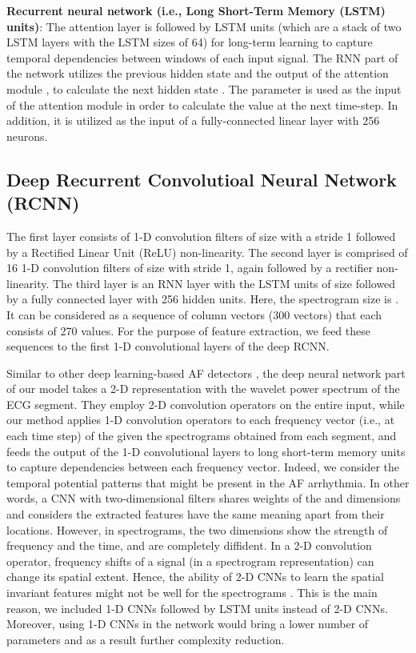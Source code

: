 \documentclass[conference]{IEEEtran}
\begin{document}
  
\noindent\textbf{Recurrent neural network (i.e., Long Short-Term Memory (LSTM) units)}:  The attention layer is followed by LSTM units (which are a stack of two LSTM layers with the LSTM sizes of 64) for long-term learning to capture temporal dependencies between windows of each input signal. The RNN part of the network utilizes the previous hidden state  and the output of the attention module , to calculate the next hidden state .  The parameter  is used as the input of the attention module in order to calculate the value  at the next time-step. In addition, it is utilized as the input of a fully-connected linear layer with 256 neurons. 



\subsection*{Deep Recurrent Convolutioal Neural Network (RCNN)}


The first layer consists of  1-D convolution filters of size  with a stride 1 followed by a Rectified Linear Unit (ReLU) non-linearity. The second layer is comprised of 16 1-D convolution filters of size  with stride 1, again followed by a rectifier non-linearity. The third layer is an RNN layer with the LSTM units of size  followed by a fully connected layer with 256 hidden units. Here, the spectrogram size is . It can be considered as a sequence of column vectors (300 vectors) that each consists of 270 values. For the purpose of feature extraction, we feed these sequences to the first 1-D convolutional layers of the deep RCNN. 

Similar to other deep learning-based AF detectors \cite{xia2018detecting,he2018automatic}, the deep neural network part of our model takes a 2-D representation with the wavelet power spectrum of the ECG segment. They employ 2-D convolution operators on the entire input, while our method applies 1-D convolution operators to each frequency vector (i.e., at each time step) of the given the spectrograms obtained from each segment, and feeds the output of the 1-D convolutional layers to long short-term memory units to capture dependencies between each frequency vector. Indeed, we consider the temporal potential patterns that might be present in the AF arrhythmia. In other words, a CNN with two-dimensional filters shares weights of the  and  dimensions and considers the extracted features have the same meaning apart from their locations. However, in spectrograms, the two dimensions show the strength of frequency and the time, and are completely diffident. In a 2-D convolution operator, frequency shifts of a signal (in a spectrogram representation) can change its spatial extent. Hence, the ability of 2-D CNNs to learn the spatial invariant features might not be well for the spectrograms \cite{wyse2017audio}. This is the main reason, we included 1-D CNNs followed by LSTM units instead of 2-D CNNs. Moreover, using 1-D CNNs in the network would bring a lower number of parameters and as a result further complexity reduction.
\end{document}
